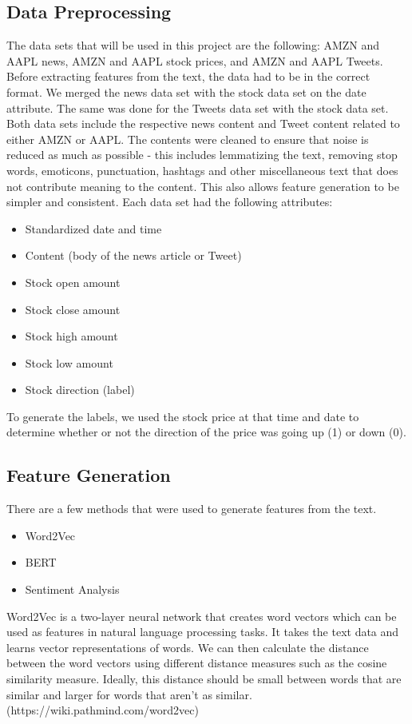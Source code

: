 \documentclass[conference]{IEEEtran}
\begin{document}
\subsection{Data Preprocessing}\label{AA}
The data sets that will be used in this project are the following: AMZN and AAPL news, AMZN and AAPL stock prices, and AMZN and AAPL Tweets. Before extracting features from the text, the data had to be in the correct format. We merged the news data set with the stock data set on the date attribute. The same was done for the Tweets data set with the stock data set. Both data sets include the respective news content and Tweet content related to either AMZN or AAPL. The contents were cleaned to ensure that noise is reduced as much as possible - this includes lemmatizing the text, removing stop words, emoticons, punctuation, hashtags and other miscellaneous text that does not contribute meaning to the content. This also allows feature generation to be simpler and consistent. Each data set had the following attributes: 
\begin{itemize}
    \item Standardized date and time
    \item Content (body of the news article or Tweet)
    \item Stock open amount
    \item Stock close amount
    \item Stock high amount
    \item Stock low amount
    \item Stock direction (label)
\end{itemize}
To generate the labels, we used the stock price at that time and date to determine whether or not the direction of the price was going up (1) or down (0). 

\subsection{Feature Generation}
There are a few methods that were used to generate features from the text.
\begin{itemize}
    \item Word2Vec
    \item BERT
    \item Sentiment Analysis
\end{itemize}

Word2Vec is a two-layer neural network that creates word vectors which can be used as features in natural language processing tasks. It takes the text data and learns vector representations of words. We can then calculate the distance between the word vectors using different distance measures such as the cosine similarity measure. Ideally, this distance should be small between words that are similar and larger for words that aren't as similar. (https://wiki.pathmind.com/word2vec)
\end{document}
